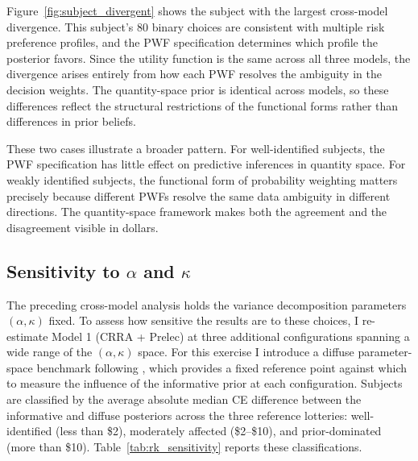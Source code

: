 \documentclass[12pt,a4paper]{article}
\theoremstyle{definition}
\theoremstyle{remark}
\begin{document}
Figure~\ref{fig:subject_divergent} shows the subject with the largest
cross-model divergence. This subject's 80 binary choices are consistent with
multiple risk preference profiles, and the PWF specification determines which
profile the posterior favors. Since the utility function is the same across all
three models, the divergence arises entirely from how each PWF resolves the
ambiguity in the decision weights. The quantity-space prior is identical across
models, so these differences reflect the structural restrictions of the
functional forms rather than differences in prior beliefs.

These two cases illustrate a broader pattern. For well-identified subjects,
the PWF specification has little effect on predictive inferences in quantity
space. For weakly identified subjects, the functional form of probability
weighting matters precisely because different PWFs resolve the same data
ambiguity in different directions. The quantity-space framework makes both the
agreement and the disagreement visible in dollars.

\subsection{Sensitivity to $\alpha$ and $\kappa$}

The preceding cross-model analysis holds the variance decomposition parameters
$(\alpha, \kappa)$ fixed. To assess how sensitive the results are to these
choices, I re-estimate Model 1 (CRRA + Prelec) at three additional
configurations spanning a wide range of the $(\alpha, \kappa)$ space. For this
exercise I introduce a diffuse parameter-space benchmark following
\textcite{Gao2022}, which provides a fixed reference point against which to
measure the influence of the informative prior at each configuration. Subjects are classified by the average absolute
median CE difference between the informative and diffuse posteriors across the
three reference lotteries: well-identified (less than \$2), moderately
affected (\$2--\$10), and prior-dominated (more than \$10).
Table~\ref{tab:rk_sensitivity} reports these classifications.
\end{document}
